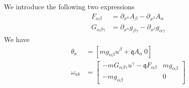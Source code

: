 We introduce the following two expressions
\begin{equation}\label{rp-cm-emTensorAndInertialPseudotensor}
	\begin{aligned}
		F_{\alpha\beta} &= \partial_{x^\alpha} A_\beta - \partial_{x^\beta} A_\alpha \\
		G_{\alpha\beta\gamma} &= \partial_{x^\alpha} g_{\beta \gamma} - \partial_{x^\beta} g_{\alpha \gamma} 
	\end{aligned}
\end{equation}
We have
\begin{equation}\label{rp-cm-kinematicSymplecticForm}
	\begin{aligned}
		\theta_a &= [m g_{\alpha\beta} u^{\beta} + \mathfrak{q} A_{\alpha} \ 0] \\
		\omega_{ab} &= \left[ \begin{matrix}
			- m G_{\alpha\beta\gamma} u^\gamma - \mathfrak{q} F_{\alpha\beta} & mg_{\alpha \beta} \\[2.2ex]
			- mg_{\alpha \beta} & 0 \end{matrix} \right] \\
	\end{aligned}
\end{equation}

